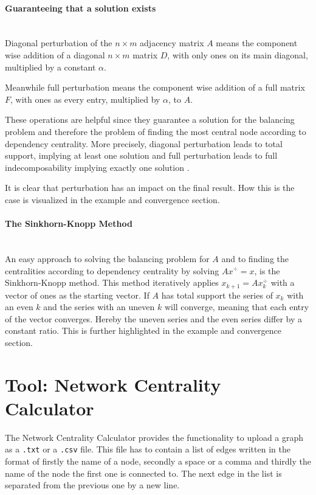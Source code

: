 \paragraph{Guaranteeing that a solution exists} \mbox{} \medskip \\
Diagonal perturbation of the $n\times m$ adjacency matrix $A$ means the component wise addition of a
diagonal $n\times m$ matrix $D$, with only 
ones on its main diagonal, multiplied by a constant $\alpha$.

Meanwhile full perturbation means the component wise addition of a full matrix $F$, with ones as every
entry, multiplied by $\alpha$, to $A$.

These operations are helpful since they guarantee a solution for the balancing problem and therefore 
the problem of finding the most central node according to dependency centrality.
More precisely, diagonal perturbation leads to total support, implying at least one solution and
full perturbation leads to full indecomposability implying exactly one solution \parencite{2016-bozzo-a}.

It is clear that perturbation has an impact on the final result. How this is the case is visualized
in the example and convergence section.

\paragraph{The Sinkhorn-Knopp Method} \mbox{} \medskip \\
An easy approach to solving the balancing problem for $A$ and to finding the centralities according to dependency
centrality by solving $Ax^\div=x$, is the Sinkhorn-Knopp method. This method iteratively applies
$x_{k+1}=Ax_{k}^\div$ with a vector of ones as the starting vector.
If $A$ has total support the series of $x_{k}$ with an even $k$ and the series with an uneven $k$ will
converge, meaning that each entry of the vector converges. Hereby the uneven series and the even series
differ by a constant ratio. This is further highlighted in the example and convergence section.

\section{Tool: Network Centrality Calculator}

The Network Centrality Calculator provides the functionality to upload a graph as
a \texttt{.txt} or a \texttt{.csv} file. This file has to contain a list of edges written in the format
of firstly the name of a node, secondly a space or a comma and thirdly the name of the node the first one is connected to.
The next edge in the list is separated from the previous one by a new line.

